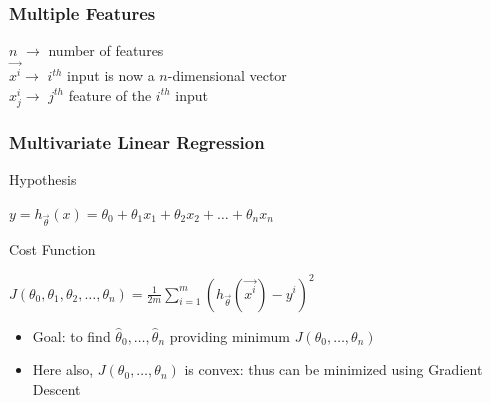 \documentclass[xcolor=pdftex,dvipsnames]{beamer}
\begin{document}
\begin{frame}
  \frametitle{Multiple Features}
  \begin{center}
  \end{center}
  \pause
  \begin{block}{}
    \alert{$n$} $\rightarrow$ number of features\\
    \alert{$\vec{x^i}$}$\rightarrow$ $i^{th}$ input is now a $n$-dimensional vector\\
    \alert{$x^i_j$}$\rightarrow$ $j^{th}$ feature of the $i^{th}$ input
  \end{block}
  
\end{frame}

\begin{frame}
  \frametitle{Multivariate Linear Regression}
  \begin{block}{Hypothesis}
    \begin{center}
      $y = h_{\vec{\theta}}(x) = \theta_0 + \theta_1 x_1 + \theta_2 x_2 + \ldots + \theta_n x_n$
    \end{center}
  \end{block}
  \pause
  \begin{block}{Cost Function}
    \begin{center}
      $J(\theta_0, \theta_1, \theta_2, \ldots, \theta_n) = \frac{1}{2m} \sum_{i=1}^m (h_{\vec{\theta}}(\vec{x^i}) - y^i)^2$
    \end{center}
  \end{block}
  \pause
  \begin{itemize}
  \item Goal: to find $\hat{\theta}_0, \ldots, \hat{\theta}_n$ providing minimum $J(\theta_0, \ldots, \theta_n)$
  \item Here also, $J(\theta_0, \ldots, \theta_n)$ is convex: thus can be minimized using \alert{Gradient Descent}
  \end{itemize}
\end{frame}
\end{document}
